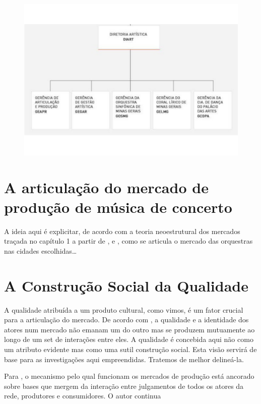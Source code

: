 \documentclass[a4paper, 12pt, openright, oneside, german, french, english, brazil]{abntex2}
\begin{document}
\begin{figure}
		\includegraphics[scale=0.35]{dirartistica.pdf}
		\label{fcsorgdir}
	\end{figure}
	
	
	
	\chapter{A articulação do mercado de produção de música de concerto}
	
	A ideia aqui é explicitar, de acordo com a teoria neoestrutural dos mercados traçada no capítulo 1 a partir de ,  e , como se articula o mercado das orquestras nas cidades escolhidas\ldots
	
	
	\chapter{A Construção Social da Qualidade}
	
	A qualidade atribuída a um produto cultural, como vimos, é um fator crucial para a articulação do mercado. De acordo com , a qualidade e a identidade dos atores num mercado não emanam um do outro mas se produzem mutuamente ao longo de um set de interações entre eles. A qualidade é concebida aqui não como um atributo evidente mas como uma sutil construção social. Esta visão servirá de base para as investigações aqui empreendidas. Tratemos de melhor delineá-la.
	
	Para , o mecanismo pelo qual funcionam os mercados de produção está ancorado sobre bases que mergem da interação entre julgamentos de todos os atores da rede, produtores e consumidores. O autor continua
	
\end{document}

